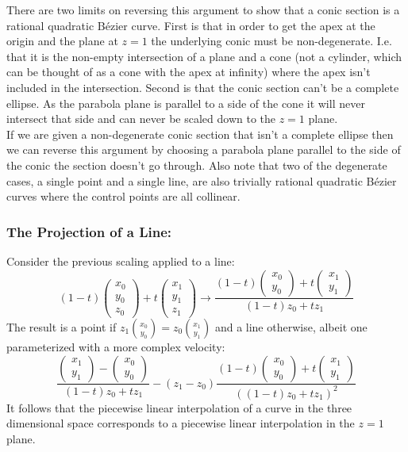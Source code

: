 There are two limits on reversing this argument to show that a conic section is a rational quadratic Bézier curve.
First is that in order to get the apex at the origin and the plane at $z=1$ the underlying conic must be non-degenerate.
I.e. that it is the non-empty intersection of a plane and a cone (not a cylinder,
which can be thought of as a cone with the apex at infinity) where the apex isn't included in the intersection.
Second is that the conic section can't be a complete ellipse.
As the parabola plane is parallel to a side of the cone it will never intersect that side and can never be scaled down to the $z=1$ plane.
\\

If we are given a non-degenerate conic section that isn't a complete ellipse then we can reverse this argument by choosing a parabola plane parallel to the side of the conic the section doesn't go through. 
Also note that two of the degenerate cases, 
a single point and a single line, 
are also trivially rational quadratic Bézier curves where the control points are all collinear.

\subsubsection{The Projection of a Line:}
Consider the previous scaling applied to a line:
\[(1-t)\begin{pmatrix} x_0\\ y_0\\ z_0\end{pmatrix}+t\begin{pmatrix} x_1\\ y_1\\ z_1\end{pmatrix}
	\rightarrow\frac{(1-t)\begin{pmatrix} x_0\\ y_0\end{pmatrix} + t\begin{pmatrix}x_1\\ y_1\end{pmatrix}}{(1-t)z_0+tz_1}\]
The result is a point if $z_1\binom{x_0}{y_0} = z_0\binom{x_1}{y_1}$ and a line otherwise,
albeit one parameterized with a more complex velocity:
\[\frac{\begin{pmatrix}x_1\\ y_1\end{pmatrix}-\begin{pmatrix} x_0\\ y_0\end{pmatrix}}{(1-t)z_0+tz_1}-(z_1-z_0)\frac{(1-t)\begin{pmatrix} x_0\\ y_0\end{pmatrix} + t\begin{pmatrix}x_1\\ y_1\end{pmatrix}}{((1-t)z_0+tz_1)^2}\]
It follows that the piecewise linear interpolation of a curve in the three dimensional space corresponds to a piecewise linear interpolation in the $z=1$ plane.
\\

